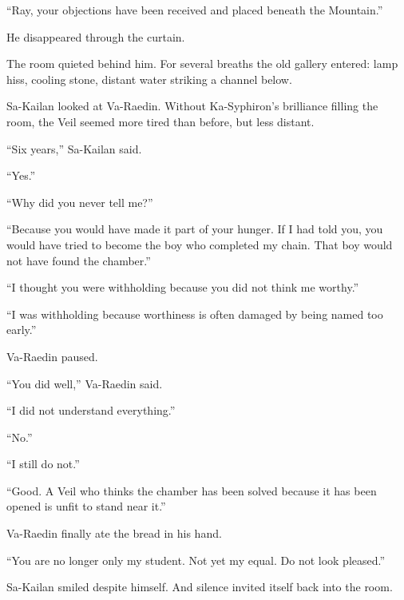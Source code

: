 “Ray, your objections have been received and placed beneath the Mountain.”\par

He disappeared through the curtain.\par

The room quieted behind him.
For several breaths the old gallery entered: lamp hiss, cooling stone, distant water striking a channel below.\par




Sa-Kailan looked at Va-Raedin.
Without Ka-Syphiron’s brilliance filling the room, the Veil seemed more tired than before, but less distant.\par

“Six years,” Sa-Kailan said.\par
“Yes.”\par
“Why did you never tell me?”\par
“Because you would have made it part of your hunger.
If I had told you, you would have tried to become the boy who completed my chain.
That boy would not have found the chamber.”\par
“I thought you were withholding because you did not think me worthy.”\par
“I was withholding because worthiness is often damaged by being named too early.”\par

Va-Raedin paused.\par

“You did well,” Va-Raedin said.\par

“I did not understand everything.”\par

“No.”\par

“I still do not.”\par

“Good.
A Veil who thinks the chamber has been solved because it has been opened is unfit to stand near it.”\par

Va-Raedin finally ate the bread in his hand.\par

“You are no longer only my student.
Not yet my equal.
Do not look pleased.”\par

Sa-Kailan smiled despite himself.
And silence invited itself back into the room.\par

